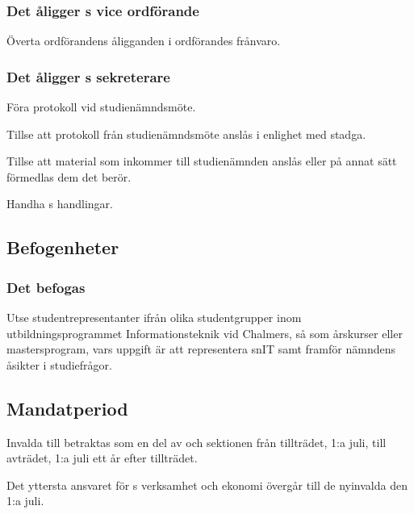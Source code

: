 \subsubsection{Det åligger \SNIT{}s vice ordförande}
\begin{att}
	\item Överta ordförandens åligganden i ordförandes frånvaro.
\end{att}

\subsubsection{Det åligger \SNIT{}s sekreterare}
\begin{att}
	\item Föra protokoll vid studienämndsmöte.
	\item Tillse att protokoll från studienämndsmöte anslås i enlighet med stadga.
	\item Tillse att material som inkommer till studienämnden anslås eller på annat sätt förmedlas dem det berör.
	\item Handha \SNIT{}s handlingar.
\end{att}

\subsection{Befogenheter}

\subsubsection{Det befogas \SNIT}
\begin{att}
	\item Utse studentrepresentanter ifrån olika studentgrupper inom utbildningsprogrammet Informationsteknik vid Chalmers, så som årskurser eller mastersprogram, vars uppgift är att representera snIT samt framför nämndens åsikter i studiefrågor.
\end{att}

\subsection{Mandatperiod}
Invalda till \SNIT{} betraktas som en del av \SNIT{} och sektionen från tillträdet, 1:a juli, till avträdet, 1:a juli ett år efter tillträdet.

Det yttersta ansvaret för \SNIT{}s verksamhet och ekonomi övergår till de nyinvalda den 1:a juli.
